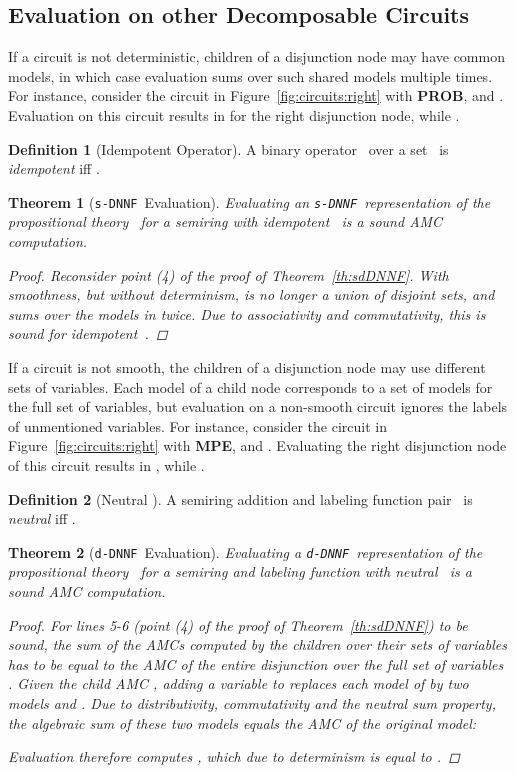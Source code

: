\documentclass{article}
\theoremstyle{plain}
\newtheorem{theorem}{Theorem}
\theoremstyle{definition}
\newtheorem{definition}{Definition}
\newcommand{\dDNNF}{{\tt d-DNNF}}
\newcommand{\sDNNF}{{\tt s-DNNF}}
\begin{document}
\subsection{Evaluation on other Decomposable Circuits}\label{sec:decomposable}
If a circuit is not deterministic, children of a disjunction node may have
common models, in which case evaluation sums over such shared models
multiple times. For instance, consider the circuit in
Figure~\ref{fig:circuits:right} with \textbf{PROB},  and
. Evaluation on this circuit results in  for
the right disjunction node, while .

\begin{definition}[Idempotent Operator]
  A binary operator~ over a set~ is \emph{idempotent} iff .
 \end{definition}

\begin{theorem}[\sDNNF\ Evaluation]\label{th:sDNNF}
 Evaluating an \sDNNF\ representation of the propositional theory~ for a semiring with idempotent~ is a sound AMC computation.
 \begin{proof}
Reconsider point (4) of the proof of Theorem~\ref{th:sdDNNF}. 
With smoothness, but without determinism,
 is no longer a union
of disjoint sets, and  sums over the
models in  twice. 
Due to associativity and commutativity,
   this is sound for idempotent~.
  \end{proof}
\end{theorem}

If a circuit is not smooth, the children of a disjunction node may use
different sets of variables. 
Each model of a child node corresponds to a set of models for the full
set of variables, but evaluation on a non-smooth circuit ignores the labels of unmentioned
variables. For instance, consider the circuit in
Figure~\ref{fig:circuits:right} with \textbf{MPE},  and
. Evaluating the right disjunction node of this circuit results in , while .

\begin{definition}[Neutral ]
  A semiring addition and labeling function pair~ is 
  \emph{neutral} iff .
\end{definition}

\begin{theorem}[\dDNNF\ Evaluation] \label{th:dDNNF}
  Evaluating a \dDNNF\ representation of the propositional theory~
  for a semiring and labeling function with  neutral~
  is a sound AMC computation.
  \begin{proof}
For lines 5-6 (point (4) of the proof of Theorem~\ref{th:sdDNNF}) to
be sound, the sum of the  AMCs computed by the children over their
sets of variables  has to be equal to the AMC of the entire disjunction
over the full set of variables . Given the child AMC
, adding a variable  to  replaces
each model  of  by two models  and .
Due to distributivity, commutativity and the neutral sum property, the algebraic sum of these two models equals the AMC of the original model:

Evaluation therefore computes , which due to determinism is equal
to .
  \end{proof}
\end{theorem}
\end{document}
